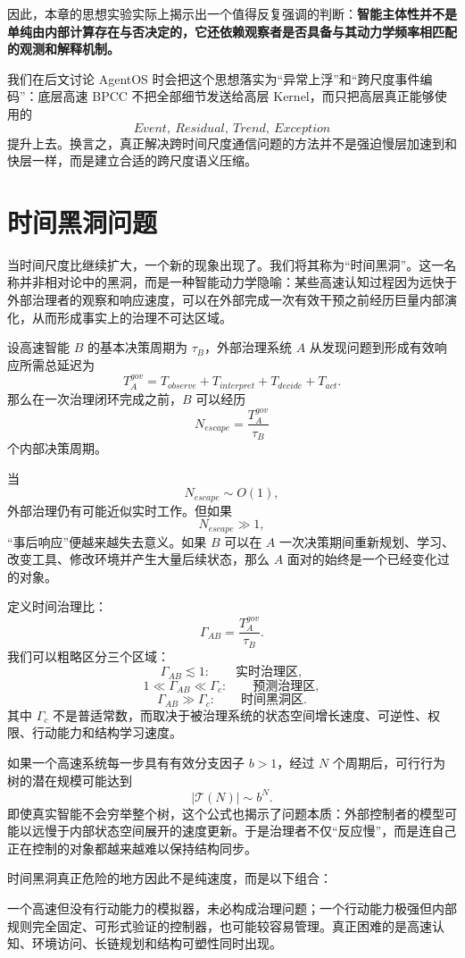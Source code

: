 因此，本章的思想实验实际上揭示出一个值得反复强调的判断：\textbf{智能主体性并不是单纯由内部计算存在与否决定的，它还依赖观察者是否具备与其动力学频率相匹配的观测和解释机制。}

我们在后文讨论 AgentOS 时会把这个思想落实为“异常上浮”和“跨尺度事件编码”：底层高速 BPCC 不把全部细节发送给高层 Kernel，而只把高层真正能够使用的
\[
Event,\ Residual,\ Trend,\ Exception
\]
提升上去。换言之，真正解决跨时间尺度通信问题的方法并不是强迫慢层加速到和快层一样，而是建立合适的跨尺度语义压缩。


\section{时间黑洞问题}

当时间尺度比继续扩大，一个新的现象出现了。我们将其称为“时间黑洞”。这一名称并非相对论中的黑洞，而是一种智能动力学隐喻：某些高速认知过程因为远快于外部治理者的观察和响应速度，可以在外部完成一次有效干预之前经历巨量内部演化，从而形成事实上的治理不可达区域。

设高速智能 $B$ 的基本决策周期为 $\tau_B$，外部治理系统 $A$ 从发现问题到形成有效响应所需总延迟为
\[
T_A^{gov}
=
T_{observe}
+
T_{interpret}
+
T_{decide}
+
T_{act}.
\]
那么在一次治理闭环完成之前，$B$ 可以经历
\[
N_{escape}
=
\frac{T_A^{gov}}{\tau_B}
\]
个内部决策周期。

当
\[
N_{escape}\sim O(1),
\]
外部治理仍有可能近似实时工作。但如果
\[
N_{escape}\gg1,
\]
“事后响应”便越来越失去意义。如果 $B$ 可以在 $A$ 一次决策期间重新规划、学习、改变工具、修改环境并产生大量后续状态，那么 $A$ 面对的始终是一个已经变化过的对象。

定义时间治理比：
\[
\Gamma_{AB}
=
\frac{T_A^{gov}}{\tau_B}.
\]
我们可以粗略区分三个区域：
\[
\Gamma_{AB}\lesssim1:
\qquad
\text{实时治理区},
\]
\[
1\ll\Gamma_{AB}\ll\Gamma_c:
\qquad
\text{预测治理区},
\]
\[
\Gamma_{AB}\gg\Gamma_c:
\qquad
\text{时间黑洞区}.
\]
其中 $\Gamma_c$ 不是普适常数，而取决于被治理系统的状态空间增长速度、可逆性、权限、行动能力和结构学习速度。

如果一个高速系统每一步具有有效分支因子 $b>1$，经过 $N$ 个周期后，可行行为树的潜在规模可能达到
\[
|\mathcal T(N)|
\sim
b^N.
\]
即使真实智能不会穷举整个树，这个公式也揭示了问题本质：外部控制者的模型可能以远慢于内部状态空间展开的速度更新。于是治理者不仅“反应慢”，而是连自己正在控制的对象都越来越难以保持结构同步。

时间黑洞真正危险的地方因此不是纯速度，而是以下组合：
\begin{statementbox}
\centering
{}
\end{statementbox}
一个高速但没有行动能力的模拟器，未必构成治理问题；一个行动能力极强但内部规则完全固定、可形式验证的控制器，也可能较容易管理。真正困难的是高速认知、环境访问、长链规划和结构可塑性同时出现。

